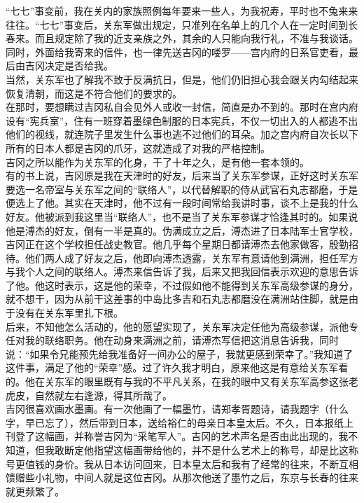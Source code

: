 “七七”事变前，我在关内的家族照例每年要来一些人，为我祝寿，平时也不兔来来往往。“七七”事变后，关东军做出规定，只准列在名单上的几个人在一定时间到长春来。而且规定除了我的近支亲族之外，其余的人只能向我行礼，不准与我谈话。\\

同时，外面给我寄来的信件，也一律先送吉冈的喽罗——宫内府的日系官吏看，最后由吉冈决定是否给我。\\

当然，关东军也了解我不致于反满抗日，但是，他们仍旧担心我会跟关内勾结起来恢复清朝，而这是不符合他们的要求的。\\

在那时，要想瞒过吉冈私自会见外人或收一封信，简直是办不到的。那时在宫内府设有“宪兵室”，住有一班穿着墨绿色制服的日本宪兵，不仅一切出入的人都逃不出他们的视线，就连院子里发生什么事也逃不过他们的耳朵。加之宫内府自次长以下所有的日本人都是吉冈的爪牙，这就造成了对我的严格控制。\\

吉冈之所以能作为关东军的化身，干了十年之久，是有他一套本领的。\\

有的书上说，吉冈原是我在天津时的好友，后来当了关东军参谋，正好这时关东军要选一名帝室与关东军之间的“联络人”，以代替解职的侍从武官石丸志都磨，于是便选上了他。其实在天津时，他不过有一段时间常给我讲时事，谈不上是我的什么好友。他被派到我这里当“联络人”，也不是当了关东军参谋才恰逢其时的。如果说他是溥杰的好友，倒有一半是真的。伪满成立之后，溥杰进了日本陆军士官学校，吉冈正在这个学校担任战史教官。他几乎每个星期日都请溥杰去他家做客，殷勤招待。他们两人成了好友之后，他即向溥杰透露，关东军有意请他到满洲，担任军方与我个人之间的联络人。溥杰来信告诉了我，后来又把我回信表示欢迎的意思告诉了他。他这时表示，这是他的荣幸，不过假如他不能得到关东军高级参谋的身分，就不想干，因为从前干这差事的中岛比多吉和石丸志都磨没在满洲站住脚，就是由于没有在关东军里扎下根。\\

后来，不知他怎么活动的，他的愿望实现了，关东军决定任他为高级参谋，派他专任对我的联络职务。他在动身来满洲之前，请溥杰写信把这消息告诉我，同时说：“如果令兄能预先给我准备好一间办公的屋子，我就更感到荣幸了。”我知道了这件事，满足了他的“荣幸”感。过了许久我才明白，原来他这是有意给关东军看的。他在关东军的眼里既有与我的不平凡关系，在我的眼中又有关东军高参这张老虎皮，自然就左右逢源，得其所哉了。\\

吉冈很喜欢画水墨画。有一次他画了一幅墨竹，请郑孝胥题诗，请我题字（什么字，早已忘了），然后带到日本，送给裕仁的母亲日本皇太后。不久，日本报纸上刊登了这幅画，并称誉吉冈为“采笔军人”。吉冈的艺术声名是否由此出现的，我不知道，但我敢断定他指望这幅画带给他的，并不是什么艺术上的称号，却是比这称号更值钱的身价。我从日本访问回来，日本皇太后和我有了经常的往来，不断互相馈赠些小礼物，中间人就是这位吉冈。从那次他送了墨竹之后，东京与长春的往来就更频繁了。\\


